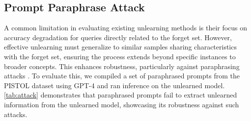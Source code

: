 

\subsection{Prompt Paraphrase Attack} \label{sec:paraphrase}

A common limitation in evaluating existing unlearning methods is their focus on accuracy degradation for queries directly related to the forget set. However, effective unlearning must generalize to similar samples sharing characteristics with the forget set, ensuring the process extends beyond specific instances to broader concepts. This enhances robustness, particularly against paraphrasing attacks \citep{thaker2024position, yao2023large}. To evaluate this, we compiled a set of paraphrased prompts from the PISTOL dataset using GPT-4 and ran inference on the \lunar unlearned model. \cref{tab:attack} demonstrates that paraphrased prompts fail to extract unlearned information from the \lunar unlearned model, showcasing its robustness against such attacks.





